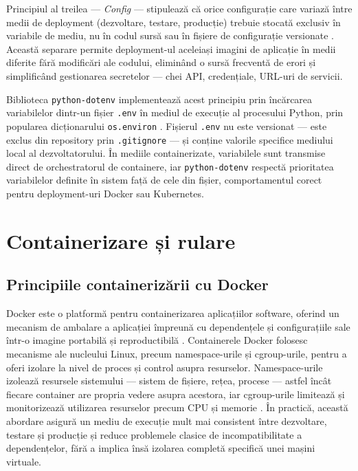 \documentclass[12pt, a4paper, oneside, romanian]{teza-upb}
\begin{document}
Principiul al treilea — \textit{Config} — stipulează că orice configurație care 
variază între medii de deployment (dezvoltare, testare, producție) trebuie stocată 
exclusiv în variabile de mediu, nu în codul sursă sau în fișiere de configurație 
versionate \cite{twelvefactor}. Această separare permite deployment-ul aceleiași 
imagini de aplicație în medii diferite fără modificări ale codului, eliminând 
o sursă frecventă de erori și simplificând gestionarea secretelor — chei API, 
credențiale, URL-uri de servicii.

Biblioteca \texttt{python-dotenv} implementează acest principiu prin încărcarea 
variabilelor dintr-un fișier \texttt{.env} în mediul de execuție al procesului 
Python, prin popularea dicționarului \texttt{os.environ} \cite{dotenv_doc}. 
Fișierul \texttt{.env} nu este versionat — este exclus din repository prin 
\texttt{.gitignore} — și conține valorile specifice mediului local al 
dezvoltatorului. În mediile containerizate, variabilele sunt transmise direct 
de orchestratorul de containere, iar \texttt{python-dotenv} respectă prioritatea 
variabilelor definite în sistem față de cele din fișier, comportamentul corect 
pentru deployment-uri Docker sau Kubernetes.




\section{Containerizare și rulare}

\subsection{Principiile containerizării cu Docker}

Docker este o platformă pentru containerizarea aplicațiilor software, 
oferind un mecanism de ambalare a aplicației împreună cu dependențele 
și configurațiile sale într-o imagine portabilă și reproductibilă 
\cite{docker_doc}. Containerele Docker folosesc mecanisme ale nucleului Linux, precum namespace-urile și cgroup-urile, pentru a oferi izolare la nivel de proces și control asupra resurselor. Namespace-urile izolează resursele sistemului — sistem de fișiere, rețea, procese — astfel încât fiecare container are propria 
vedere asupra acestora, iar cgroup-urile limitează și monitorizează utilizarea 
resurselor precum CPU și memorie \cite{docker_doc}. În practică, această abordare asigură un mediu de execuție mult mai consistent între dezvoltare, testare și producție și reduce problemele clasice de incompatibilitate a dependențelor, fără a implica însă izolarea completă specifică unei mașini virtuale.
\end{document}
